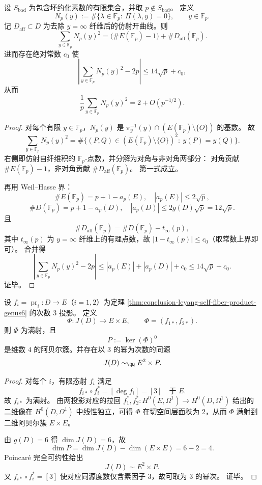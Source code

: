 \begin{theorem}[有限域纤维计数二阶矩恒等式与有效误差界]\label{thm:conclusion-leyang-finite-field-second-moment}
设 \(S_{\mathrm{bad}}\) 为包含坏约化素数的有限集合，并取 \(p\notin S_{\mathrm{bad}}\)。
定义
\[
N_p(y):=\#\{\lambda\in\mathbb F_p:\ \Pi(\lambda,y)=0\},\qquad y\in\mathbb F_p.
\]
记 \(D_{\mathrm{aff}}\subset D\) 为去除 \(y=\infty\) 纤维后的仿射开曲线。则
\[
\sum_{y\in\mathbb F_p}N_p(y)^2
=\bigl(\#E(\mathbb F_p)-1\bigr)+\#D_{\mathrm{aff}}(\mathbb F_p).
\]
进而存在绝对常数 \(c_0\) 使
\[
\left|
\sum_{y\in\mathbb F_p}N_p(y)^2-2p
\right|
\le 14\sqrt p+c_0,
\]
从而
\[
\frac1p\sum_{y\in\mathbb F_p}N_p(y)^2=2+O(p^{-1/2}).
\]
\end{theorem}
\begin{proof}
对每个有限 \(y\in\mathbb F_p\)，\(N_p(y)\) 是 \(\pi_y^{-1}(y)\cap(E(\mathbb F_p)\setminus\{O\})\) 的基数。
故
\[
\sum_{y\in\mathbb F_p}N_p(y)^2
=\#\{(P,Q)\in(E(\mathbb F_p)\setminus\{O\})^2:\ y(P)=y(Q)\}.
\]
右侧即仿射自纤维积的 \(\mathbb F_p\)-点数，并分解为对角与非对角两部分：
对角贡献 \(\#E(\mathbb F_p)-1\)，非对角贡献 \(\#D_{\mathrm{aff}}(\mathbb F_p)\)。
第一式成立。

再用 Weil--Hasse 界：
\[
\#E(\mathbb F_p)=p+1-a_p(E),\quad |a_p(E)|\le 2\sqrt p,
\]
\[
\#D(\mathbb F_p)=p+1-a_p(D),\quad |a_p(D)|\le 2g(D)\sqrt p=12\sqrt p.
\]
且
\[
\#D_{\mathrm{aff}}(\mathbb F_p)=\#D(\mathbb F_p)-t_{\infty}(p),
\]
其中 \(t_{\infty}(p)\) 为 \(y=\infty\) 纤维上的有理点数，故 \(|1-t_{\infty}(p)|\le c_0\)（取常数上界即可）。
合并得
\[
\left|
\sum_{y\in\mathbb F_p}N_p(y)^2-2p
\right|
\le |a_p(E)|+|a_p(D)|+c_0
\le 14\sqrt p+c_0.
\]
证毕。
\end{proof}



\begin{proposition}\label{prop:conclusion-leyang-jd-prym-decomposition}
设 \(f_i=\operatorname{pr}_i:D\to E\)（\(i=1,2\)）为定理 \ref{thm:conclusion-leyang-self-fiber-product-genus6} 的次数 \(3\) 投影。
定义
\[
\Phi:J(D)\longrightarrow E\times E,\qquad \Phi=(f_{1*},f_{2*}).
\]
则 \(\Phi\) 为满射，且
\[
P:=\ker(\Phi)^0
\]
是维数 \(4\) 的阿贝尔簇。并存在以 \(3\) 的幂为次数的同源
\[
J(D)\sim_{\QQ}E^2\times P.
\]
\end{proposition}
\begin{proof}
对每个 \(i\)，有限态射 \(f_i\) 满足
\[
f_{i*}\circ f_i^*=[\deg f_i]=[3]\quad\text{于 }E.
\]
故 \(f_{i*}\) 为满射。
由两投影对应的拉回 \(f_1^*,f_2^*:H^0(E,\Omega^1)\to H^0(D,\Omega^1)\) 给出的二维像在 \(H^0(D,\Omega^1)\) 中线性独立，可得 \(\Phi\) 在切空间层面秩为 \(2\)，从而 \(\Phi\) 满射到二维阿贝尔簇 \(E\times E\)。

由 \(g(D)=6\) 得 \(\dim J(D)=6\)，故
\[
\dim P=\dim J(D)-\dim(E\times E)=6-2=4.
\]
Poincar\'e 完全可约性给出
\[
J(D)\sim E^2\times P.
\]
又 \(f_{i*}\circ f_i^*=[3]\) 使对应同源度数仅含素因子 \(3\)，故可取为 \(3\) 的幂次。
证毕。
\end{proof}

